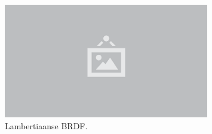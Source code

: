 \begin{figure}
  \centering
  \includegraphics[width=0.8\textwidth]{./img/raw/placeholder.png}
  \caption{Lambertiaanse BRDF.}
  \label{fig:sh-lambert}
\end{figure}
